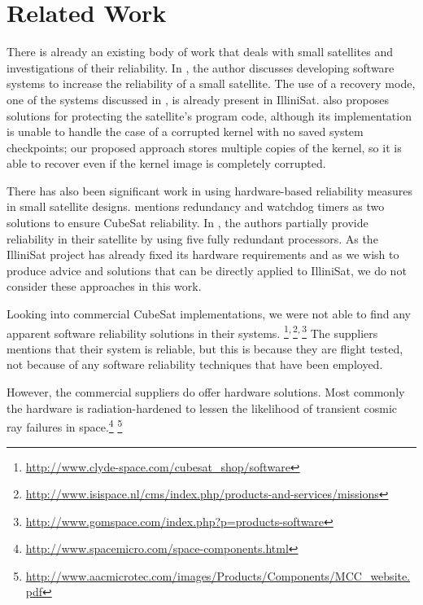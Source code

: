 \section{Related Work}\label{sec:related_work}
There is already an existing body of work that deals with small satellites and
investigations of their reliability.  In \cite{odegaard2013error}, the author
discusses developing software systems to increase the reliability of a small satellite.
The use of a recovery mode, one of the systems discussed in
\cite{odegaard2013error}, is already present in IlliniSat.
\cite{odegaard2013error} also proposes solutions for protecting the satellite's
program code, although its implementation is unable to handle the case of a
corrupted kernel with no saved system checkpoints; our proposed approach stores
multiple copies of the kernel, so it is able to recover even if the kernel image
is completely corrupted.

There has also been significant work in using hardware-based reliability measures in small satellite designs.  \cite{toorian2008cubesat} mentions redundancy and watchdog timers as two solutions to ensure CubeSat reliability.  In \cite{passerone2008design}, the authors partially provide reliability in their satellite by using five fully redundant processors.   As the IlliniSat project has already fixed its hardware requirements and as we wish to produce advice and solutions that can be directly applied to IlliniSat, we do not consider these approaches in this work.

Looking into commercial CubeSat implementations, we were not able to 
find any apparent software reliability solutions in their systems.
\footnote{\url{http://www.clyde-space.com/cubesat_shop/software}}$^\textnormal{,}$\footnote{\url{http://www.isispace.nl/cms/index.php/products-and-services/missions}}$^\textnormal{,}$\footnote{\url{http://www.gomspace.com/index.php?p=products-software}}
The suppliers mentions that their system is reliable, but this is because
they are flight tested, not because of any software reliability techniques that
have been employed.

However, the commercial suppliers do offer hardware solutions. Most commonly
the hardware is radiation-hardened to lessen the likelihood of transient cosmic ray
failures in space.\footnote{\url{http://www.spacemicro.com/space-components.html}}
\footnote{\url{http://www.aacmicrotec.com/images/Products/Components/MCC_website.pdf}}




